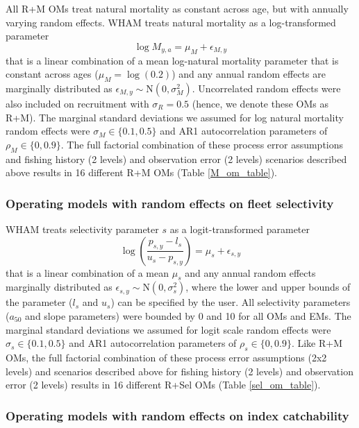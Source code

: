 \documentclass[
  12pt,
]{article}
\begin{document}
All R+M OMs treat natural mortality as constant across age, but with
annually varying random effects. WHAM treats natural mortality as a
log-transformed parameter \[
\log M_{y,a} = \mu_{M} + \epsilon_{M,y}
\] that is a linear combination of a mean log-natural mortality
parameter that is constant across ages (\(\mu_{M} = \log(0.2)\)) and any
annual random effects are marginally distributed as
\(\epsilon_{M,y} \sim \text{N}\left(0,\sigma_M^2\right)\). Uncorrelated
random effects were also included on recruitment with \(\sigma_R = 0.5\)
(hence, we denote these OMs as R+M). The marginal standard deviations we
assumed for log natural mortality random effects were
\(\sigma_M \in \{0.1, 0.5\}\) and AR1 autocorrelation parameters of
\(\rho_M \in \{0,0.9\}\). The full factorial combination of these
process error assumptions and fishing history (2 levels) and observation
error (2 levels) scenarios described above results in 16 different R+M
OMs (Table \ref{M_om_table}).

\hypertarget{operating-models-with-random-effects-on-fleet-selectivity}{%
\subsubsection*{Operating models with random effects on fleet
selectivity}\label{operating-models-with-random-effects-on-fleet-selectivity}}

WHAM treats selectivity parameter \(s\) as a logit-transformed parameter
\[
\log\left(\frac{p_{s,y}-l_{s}}{u_{s}-p_{s,y}}\right) = \mu_s + \epsilon_{s,y}
\] that is a linear combination of a mean \(\mu_s\) and any annual
random effects marginally distributed as
\(\epsilon_{s,y} \sim \text{N}\left(0,\sigma_s^2\right)\), where the
lower and upper bounds of the parameter (\(l_s\) and \(u_s\)) can be
specified by the user. All selectivity parameters (\(a_{50}\) and slope
parameters) were bounded by 0 and 10 for all OMs and EMs. The marginal
standard deviations we assumed for logit scale random effects were
\(\sigma_s \in \{0.1, 0.5\}\) and AR1 autocorrelation parameters of
\(\rho_s \in \{0,0.9\}\). Like R+M OMs, the full factorial combination
of these process error assumptions (2x2 levels) and scenarios described
above for fishing history (2 levels) and observation error (2 levels)
results in 16 different R+Sel OMs (Table \ref{sel_om_table}).

\hypertarget{operating-models-with-random-effects-on-index-catchability}{%
\subsubsection*{Operating models with random effects on index
catchability}\label{operating-models-with-random-effects-on-index-catchability}}
\end{document}
